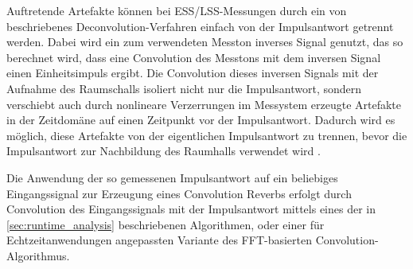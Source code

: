 Auftretende Artefakte können bei ESS/LSS-Messungen durch ein von \cite{farina2000} beschriebenes Deconvolution-Verfahren einfach von der Impulsantwort getrennt werden.
Dabei wird ein zum verwendeten Messton inverses Signal genutzt, das so berechnet wird, dass eine Convolution des Messtons mit dem inversen Signal einen Einheitsimpuls ergibt.
Die Convolution dieses inversen Signals mit der Aufnahme des Raumschalls isoliert nicht nur die Impulsantwort, sondern verschiebt auch durch nonlineare Verzerrungen im Messystem
erzeugte Artefakte in der Zeitdomäne auf einen Zeitpunkt vor der Impulsantwort. Dadurch wird es möglich, diese Artefakte von der eigentlichen Impulsantwort
zu trennen, bevor die Impulsantwort zur Nachbildung des Raumhalls verwendet wird \cite{farina2000}. 

Die Anwendung der so gemessenen Impulsantwort auf ein beliebiges Eingangssignal
zur Erzeugung eines Convolution Reverbs erfolgt durch Convolution des Eingangssignals mit der Impulsantwort mittels eines der in \ref{sec:runtime_analysis} beschriebenen
Algorithmen, oder einer für Echtzeitanwendungen angepassten Variante des FFT-basierten Convolution-Algorithmus.



